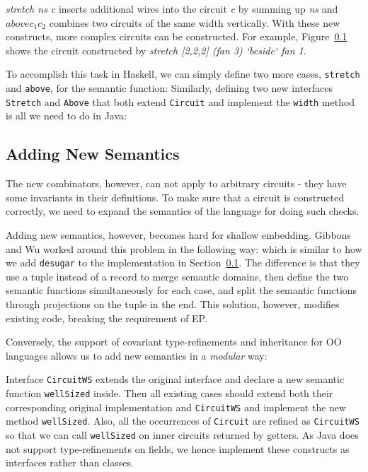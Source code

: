 \emph{stretch ns c} inserts additional wires into the circuit \emph{c} by
summing up \emph{ns} and $above c_1 c_2$ combines two circuits of the same width vertically.
With these new constructs, more complex circuits can be constructed.
For example, Figure~\ref{} shows the circuit constructed by \emph{stretch [2,2,2] (fan 3) `beside` fan 1}.

To accomplish this task in Haskell, we can simply define two more cases,
\texttt{stretch} and \texttt{above}, for the semantic function:
Similarly, defining two new interfaces
\texttt{Stretch} and \texttt{Above} that both extend \texttt{Circuit} and
implement the \texttt{width} method is all we need to do in Java:


\subsection{Adding New Semantics}
The new combinators, however, can not apply to arbitrary circuits - they have
some invariants in their definitions.
To make sure that a circuit is constructed correctly, we need to expand the
semantics of the language for doing such checks.

Adding new semantics, however, becomes hard for shallow embedding.
Gibbons and Wu worked around this problem in the following way:
which is similar to how we add \texttt{desugar} to the implementation in Section~\ref{}.
The difference is that they use a tuple instead of a record to merge semantic
domains, then define the two semantic functions simultaneously for each
case, and split the semantic functions through projections on the tuple in the end.
This solution, however, modifies existing code, breaking the requirement of EP.

Conversely, the support of covariant type-refinements and inheritance for OO
languages allows us to add new semantics in a \emph{modular} way:

Interface \texttt{CircuitWS} extends the original interface and declare a new
semantic function \texttt{wellSized} inside.
Then all existing cases should extend both their corresponding original
implementation and \texttt{CircuitWS} and implement the new method
\texttt{wellSized}. Also, all the occurrences of \texttt{Circuit} are
refined as \texttt{CircuitWS} so that we can call \texttt{wellSized} on inner circuits returned by getters.
As Java does not support type-refinements on fields, we hence implement these
constructs as interfaces rather than classes.

